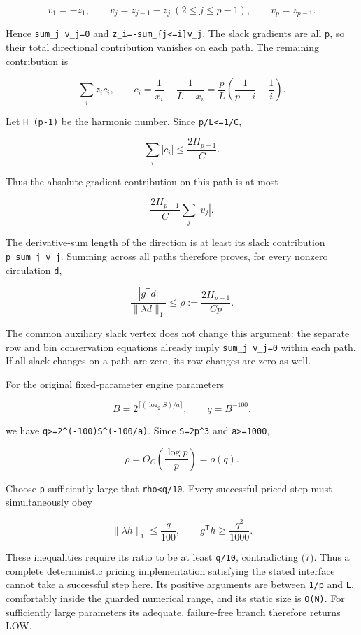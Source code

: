 \[
v_1=-z_1,\qquad v_j=z_{j-1}-z_j\ (2\le j\le p-1),\qquad v_p=z_{p-1}.
\]

Hence \texttt{sum\_j\ v\_j=0} and \texttt{z\_i=-sum\_\{j\textless{}=i\}v\_j}. The slack gradients are all \texttt{p}, so their total directional contribution vanishes on each path. The remaining contribution is

\[
\sum_i z_i c_i,\qquad c_i=\frac1{x_i}-\frac1{L-x_i}=\frac pL\left(\frac1{p-i}-\frac1i\right).\tag{6}
\]

Let \texttt{H\_(p-1)} be the harmonic number. Since \texttt{p/L\textless{}=1/C},

\[
\sum_i|c_i|\le\frac{2H_{p-1}}C.
\]

Thus the absolute gradient contribution on this path is at most

\[
\frac{2H_{p-1}}C\sum_j|v_j|.
\]

The derivative-sum length of the direction is at least its slack contribution \texttt{p\ sum\_j\ \textbar{}v\_j\textbar{}}. Summing across all paths therefore proves, for every nonzero circulation \texttt{d},

\[
\frac{|g^{\mathsf T}d|}{\|\lambda d\|_1}\le\rho:=\frac{2H_{p-1}}{Cp}.\tag{7}
\]

The common auxiliary slack vertex does not change this argument: the separate row and bin conservation equations already imply \texttt{sum\_j\ v\_j=0} within each path. If all slack changes on a path are zero, its row changes are zero as well.

For the original fixed-parameter engine parameters

\[
B=2^{\lceil(\log_2S)/a\rceil},\qquad q=B^{-100}.
\]

we have \texttt{q\textgreater{}=2\^{}(-100)S\^{}(-100/a)}. Since \texttt{S=2p\^{}3} and \texttt{a\textgreater{}=1000},

\[
\rho=O_C\left(\frac{\log p}{p}\right)=o(q).\tag{8}
\]

Choose \texttt{p} sufficiently large that \texttt{rho\textless{}q/10}. Every successful priced step must simultaneously obey

\[
\|\lambda h\|_1\le\frac q{100},\qquad g^{\mathsf T}h\ge\frac{q^2}{1000}.
\]

These inequalities require its ratio to be at least \texttt{q/10}, contradicting (7). Thus a complete deterministic pricing implementation satisfying the stated interface cannot take a successful step here. Its positive arguments are between \texttt{1/p} and \texttt{L}, comfortably inside the guarded numerical range, and its static size is \texttt{O(N)}. For sufficiently large parameters its adequate, failure-free branch therefore returns LOW.

